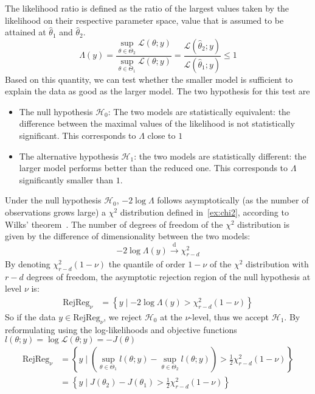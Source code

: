 \documentclass[../../Main_ManuscritThese.tex]{subfiles}
\begin{document}
The likelihood ratio is defined as the ratio of the largest values taken by the likelihood on their respective parameter space, value that is assumed to be attained at $\hat{\theta}_1$ and $\hat{\theta}_2$.
\begin{equation}
  \label{eq:def_lik_ratio}
  \Lambda(y) = \frac{\sup_{\theta \in \Theta_2} \mathcal{L}(\theta ; y)}{\sup_{\theta \in \Theta_1} \mathcal{L}(\theta ; y)} = \frac{\mathcal{L}(\hat{\theta}_2 ; y)}{\mathcal{L}(\hat{\theta}_1 ; y)} \leq 1
\end{equation}
Based on this quantity, we can test whether the smaller model is sufficient to explain the data as good as the larger model. The two hypothesis for this test are
\begin{itemize}
\item The null hypothesis $\mathcal{H}_0$: The two models are statistically equivalent: the difference between the maximal values of the likelihood is not statistically significant. This corresponds to $\Lambda$ close to $1$
\item  The alternative hypothesis $\mathcal{H}_1$: the two models are statistically different: the larger model performs better than the reduced one. This corresponds to $\Lambda$ significantly smaller than $1$.
\end{itemize}
Under the null hypothesis  $\mathcal{H}_0$, $-2 \log \Lambda$ follows asymptotically (as the number of observations grows large) a $\chi^2$ distribution defined in~\cref{ex:chi2}, according to Wilks' theorem~\cite{wilks_large-sample_1938}. The number of degrees of freedom of the $\chi^2$ distribution is given by the difference of dimensionality between the two models:
\begin{equation}
  \label{eq:deviance_asymptotics}
  - 2 \log \Lambda(y) \xrightarrow[]{\mathrm{d}} \chi^2_{r-d}
\end{equation}
By denoting $\chi^2_{r-d}(1-\nu)$ the quantile of order $1-\nu$ of the $\chi^2$ distribution with $r-d$ degrees of freedom, the asymptotic rejection region of the null hypothesis at level $\nu$ is:
\begin{align}
  \mathrm{RejReg}_{\nu} &= \left\{y \mid -2 \log \Lambda(y) > \chi^2_{r-d}(1-\nu) \right\} \label{eq:LRT_rej_reg}
\end{align}
So if the data $y \in \mathrm{RejReg}_{\nu}$, we reject $\mathcal{H}_0$ at the $\nu$-level, thus we accept $\mathcal{H}_1$.
By reformulating using the log-likelihoods and objective functions $l(\theta;y) = \log \mathcal{L}(\theta;y) = - J(\theta)$
\begin{align}
  \mathrm{RejReg}_{\nu} &= \left\{ y \mid (\sup_{\theta\in\Theta_1} l(\theta;y) - \sup_{\theta\in\Theta_2} l(\theta;y)) > \frac12 \chi^2_{r-d}(1-\nu) \right\} \\
                             &= \left\{ y \mid J(\theta_2) - J(\theta_1) >  \frac12 \chi^2_{r-d}(1-\nu) \right\} \label{eq:rejreg_chi2}
\end{align}
\end{document}
